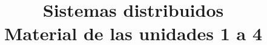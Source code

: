\documentclass[11pt,a4paper,oneside]{book}
\begin{document}
\frontmatter
\title{\textbf{Sistemas distribuidos}\\[0.6em]\large Material de las unidades 1 a 4}
\author{}
\date{}
\maketitle
\tableofcontents
\mainmatter




\end{document}

